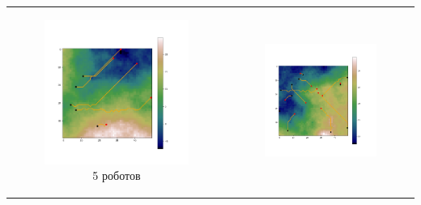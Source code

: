 \documentclass{article}
\numberwithin{equation}{section}
\begin{document}
	\begin{table}[H]
		\begin{tabular}{c c}
			\begin{subfigure}{0.5\linewidth}
				\includegraphics[width = 1.0\columnwidth]{data/mean_paths/50x50/5.png}
			\caption*{5 роботов}
			\end{subfigure}
			&
			\begin{subfigure}{0.5\linewidth}
				\includegraphics[width = 1.0\columnwidth]{data/mean_paths/50x50/10.png}

\end{subfigure}
\end{tabular}
\end{table}
\end{document}

